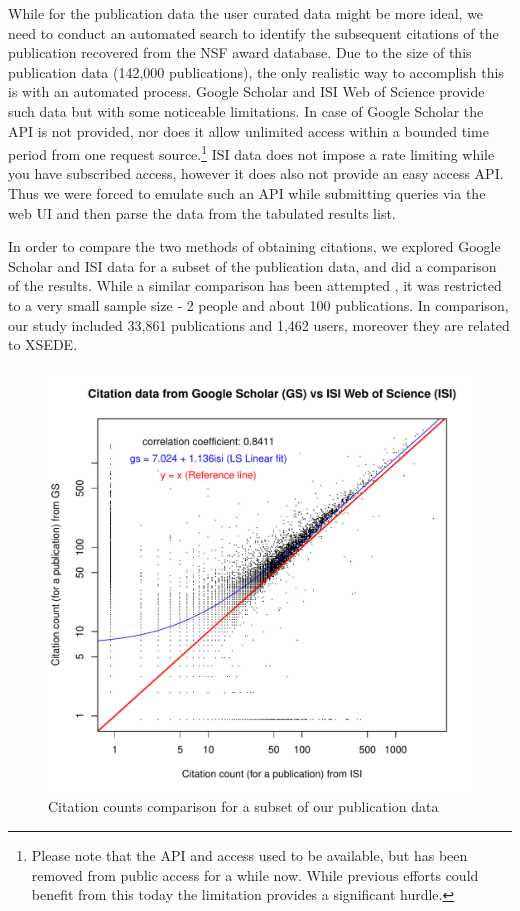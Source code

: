 \documentclass{sig-alternate}
\begin{document}
While for the publication data the user curated data might be more ideal, we need to conduct an automated search to identify the subsequent citations of the publication recovered from the NSF award database. 
Due to the size of this publication data (142,000 publications), the only realistic way to accomplish this is with an automated process. Google Scholar and ISI Web of Science provide such data but with some noticeable limitations. In case of Google Scholar the API is not provided, nor does it allow unlimited access within a bounded time period from one request source.\footnote{Please note that the API and access used to be available, but has been removed from public access for a while now. While previous efforts could benefit from this today the limitation provides a significant hurdle.} ISI data does not impose a rate limiting while you have subscribed access, however it does also not provide an easy access API. Thus we were forced to emulate such an API while submitting queries via the web UI and then parse the data from the tabulated results list. 
 
In order to compare the two methods of obtaining citations, we explored Google Scholar and ISI data for a subset of the publication data, and did a comparison of the results. While a similar comparison has been attempted \cite{yang2006citation}, it was restricted to a very small sample size - 2 people and about 100 publications. In comparison, our study included 33,861 publications and 1,462 users, moreover they are related to XSEDE.
 
\begin{figure}[!htb] 
  \centering 
    \includegraphics[width=1.0\columnwidth]{images/11_gs_vs_isi_cites.pdf} 
  \caption{Citation counts comparison for a subset of our publication data}\label{F:gs-vs-isi-cites} 
\end{figure} 
 
\end{document}

